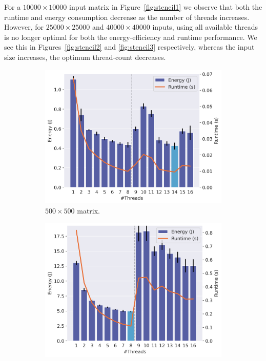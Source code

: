 For a $10000 \times 10000$ input matrix in Figure~\ref{fig:stencil1} we observe that both the
runtime and energy consumption decrease as the number of threads increases. However, for $25000
\times 25000$ and $40000 \times 40000$ inputs, using all available threads is no longer optimal for
both the energy-efficiency and runtime performance. We see this in Figures~\ref{fig:stencil2} and
\ref{fig:stencil3} respectively, whereas the input size increases, the optimum thread-count
decreases.

\begin{figure}[!ht]
    \centering
    \begin{subfigure}{0.33\linewidth}
        \includegraphics[width=\linewidth]{images/matmul_500.png}
        \caption{$500 \times 500$ matrix.}
        \label{fig:matmul1}
    \end{subfigure}%
    \begin{subfigure}{0.33\linewidth}
        \includegraphics[width=\linewidth]{images/matmul_1000.png}

\end{subfigure}
\end{figure}
